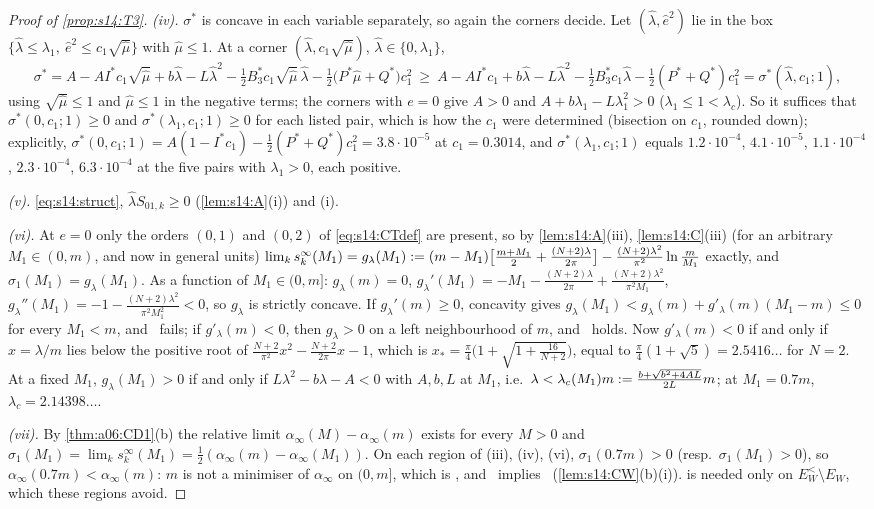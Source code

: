 \begin{proof}[Proof of \cref{prop:s14:T3}]
\emph{(iv).} $\sigma^*$ is concave in each variable separately, so again the corners decide. Let $(\hat\lambda,\hat e^2)$ lie in the box $\{\hat\lambda\le\lambda_1,\ \hat e^2\le c_1\sqrt{\hat\mu}\}$ with $\hat\mu\le1$. At a corner $(\hat\lambda,c_1\sqrt{\hat\mu})$, $\hat\lambda\in\{0,\lambda_1\}$,
\[
\sigma^*=A-AI^*c_1\sqrt{\hat\mu}+b\hat\lambda-L\hat\lambda^2-\tfrac12B_3^*c_1\sqrt{\hat\mu}\,\hat\lambda-\tfrac12\big(P^*\hat\mu+Q^*\big)c_1^2\ \ge\ A-AI^*c_1+b\hat\lambda-L\hat\lambda^2-\tfrac12B_3^*c_1\hat\lambda-\tfrac12(P^*+Q^*)c_1^2=\sigma^*(\hat\lambda,c_1;1),
\]
using $\sqrt{\hat\mu}\le1$ and $\hat\mu\le1$ in the negative terms; the corners with $e=0$ give $A>0$ and $A+b\lambda_1-L\lambda_1^2>0$ ($\lambda_1\le1<\lambda_c$). So it suffices that $\sigma^*(0,c_1;1)\ge0$ and $\sigma^*(\lambda_1,c_1;1)\ge0$ for each listed pair, which is how the $c_1$ were determined (bisection on $c_1$, rounded down); explicitly, $\sigma^*(0,c_1;1)=A(1-I^*c_1)-\frac12(P^*+Q^*)c_1^2=3.8\cdot10^{-5}$ at $c_1=0.3014$, and $\sigma^*(\lambda_1,c_1;1)$ equals $1.2\cdot10^{-4}$, $4.1\cdot10^{-5}$, $1.1\cdot10^{-4}$, $2.3\cdot10^{-4}$, $6.3\cdot10^{-4}$ at the five pairs with $\lambda_1>0$, each positive.

\emph{(v).} \eqref{eq:s14:struct}, $\hat\lambda S_{01,k}\ge0$ (\cref{lem:s14:A}(i)) and (i).

\emph{(vi).} At $e=0$ only the orders $(0,1)$ and $(0,2)$ of \eqref{eq:s14:CTdef} are present, so by \cref{lem:s14:A}(iii), \cref{lem:s14:C}(iii) (for an arbitrary $M_1\in(0,m)$, and now in general units) $\lim_ks^\infty_k(M_1)=g_\lambda(M_1):=(m-M_1)\big[\frac{m+M_1}2+\frac{(N+2)\lambda}{2\pi}\big]-\frac{(N+2)\lambda^2}{\pi^2}\ln\frac m{M_1}$ exactly, and $\sigma_1(M_1)=g_\lambda(M_1)$. As a function of $M_1\in(0,m]$: $g_\lambda(m)=0$, $g_\lambda'(M_1)=-M_1-\frac{(N+2)\lambda}{2\pi}+\frac{(N+2)\lambda^2}{\pi^2M_1}$, $g_\lambda''(M_1)=-1-\frac{(N+2)\lambda^2}{\pi^2M_1^2}<0$, so $g_\lambda$ is strictly concave. If $g_\lambda'(m)\ge0$, concavity gives $g_\lambda(M_1)<g_\lambda(m)+g'_\lambda(m)(M_1-m)\le0$ for every $M_1<m$, and \Tthree\ fails; if $g'_\lambda(m)<0$, then $g_\lambda>0$ on a left neighbourhood of $m$, and \Tthree\ holds. Now $g'_\lambda(m)<0$ if and only if $x=\lambda/m$ lies below the positive root of $\frac{N+2}{\pi^2}x^2-\frac{N+2}{2\pi}x-1$, which is $x_*=\frac\pi4\big(1+\sqrt{1+\frac{16}{N+2}}\big)$, equal to $\frac\pi4(1+\sqrt5)=2.5416\ldots$ for $N=2$. At a fixed $M_1$, $g_\lambda(M_1)>0$ if and only if $L\lambda^2-b\lambda-A<0$ with $A,b,L$ at $M_1$, i.e.\ $\lambda<\lambda_c(M_1)m:=\frac{b+\sqrt{b^2+4AL}}{2L}m$; at $M_1=0.7m$, $\lambda_c=2.14398\ldots$.

\emph{(vii).} By \cref{thm:a06:CD1}(b) the relative limit $\alpha_\infty(M)-\alpha_\infty(m)$ exists for every $M>0$ and $\sigma_1(M_1)=\lim_ks^\infty_k(M_1)=\frac12(\alpha_\infty(m)-\alpha_\infty(M_1))$. On each region of (iii), (iv), (vi), $\sigma_1(0.7m)>0$ (resp.\ $\sigma_1(M_1)>0$), so $\alpha_\infty(0.7m)<\alpha_\infty(m)$: $m$ is not a minimiser of $\alpha_\infty$ on $(0,m]$, which is \sxivNEl, and \sxivNEl\ implies \sxivNE\ (\cref{lem:s14:CW}(b)(i)).  is needed only on $E^<_W\setminus E_W$, which these regions avoid.
\end{proof}
